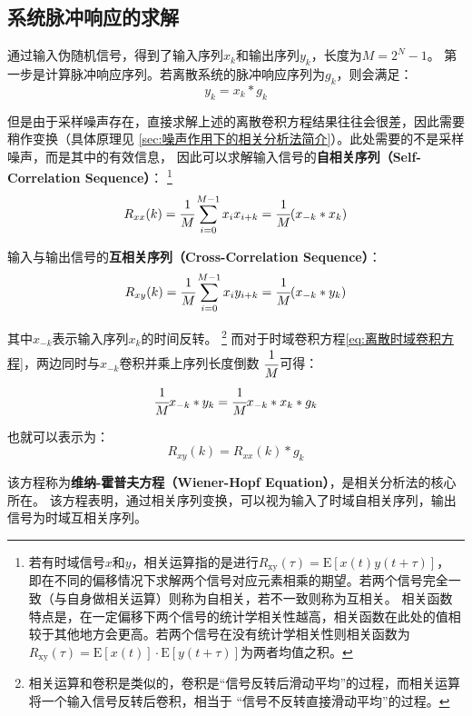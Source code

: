 \subsection{系统脉冲响应的求解}

通过输入伪随机信号，得到了输入序列\(x_k\)和输出序列\(y_k\)，长度为\(M=2^N-1\)。
第一步是计算脉冲响应序列。若离散系统的脉冲响应序列为\(g_k\)，则会满足：
\begin{equation}
    y_k=x_k * g_k
    \label{eq:离散时域卷积方程}
\end{equation}

但是由于采样噪声存在，直接求解上述的离散卷积方程结果往往会很差，因此需要稍作变换（具体原理见
\ref{sec:噪声作用下的相关分析法简介}）。此处需要的不是采样噪声，而是其中的有效信息，
因此可以求解输入信号的\textbf{自相关序列（Self-Correlation Sequence）}：
\footnote{若有时域信号\(x\)和\(y\)，相关运算指的是进行\(R_{\mathrm{xy}}(\tau)=\text{E}[x(t)y(t+\tau)]\)，
即在不同的偏移情况下求解两个信号对应元素相乘的期望。若两个信号完全一致（与自身做相关运算）则称为自相关，若不一致则称为互相关。
相关函数特点是，在一定偏移下两个信号的统计学相关性越高，相关函数在此处的值相较于其他地方会更高。若两个信号在没有统计学相关性则相关函数为
\(R_{\mathrm{xy}}(\tau)=\text{E}[x(t)]\cdot \text{E}[y(t+\tau)]\)为两者均值之积。
}
\begin{equation*}
    R_{xx}(k)=\cfrac 1M\sum_{i=0}^{M-1} x_i x_{i+k} =\cfrac 1M(x_{{-k}} * x_{k})
\end{equation*}

输入与输出信号的\textbf{互相关序列（Cross-Correlation Sequence）}：
\begin{equation*}
    R_{xy}(k)=\cfrac 1M\sum_{i=0}^{M-1} x_i y_{i+k} =\cfrac 1M(x_{{-k}} * y_{k})
\end{equation*}

其中\(x_{-k}\)表示输入序列\(x_k\)的时间反转。
\footnote{相关运算和卷积是类似的，卷积是“信号反转后滑动平均”的过程，而相关运算将一个输入信号反转后卷积，相当于
“信号不反转直接滑动平均”的过程。}
而对于时域卷积方程\ref{eq:离散时域卷积方程}，两边同时与\(x_{-k}\)卷积并乘上序列长度倒数
\(\cfrac 1M\)可得：
\begin{equation*}
    \cfrac 1M x_{-k}*y_k=\cfrac 1Mx_{-k}*x_k*g_k
\end{equation*}

也就可以表示为：
\begin{equation}
    R_{xy}(k)=R_{xx}(k)*g_k
    \label{eq:维纳-霍普夫方程}
\end{equation}

该方程称为\textbf{维纳-霍普夫方程（Wiener-Hopf Equation）}，是相关分析法的核心所在。
该方程表明，通过相关序列变换，可以视为输入了时域自相关序列，输出信号为时域互相关序列。

